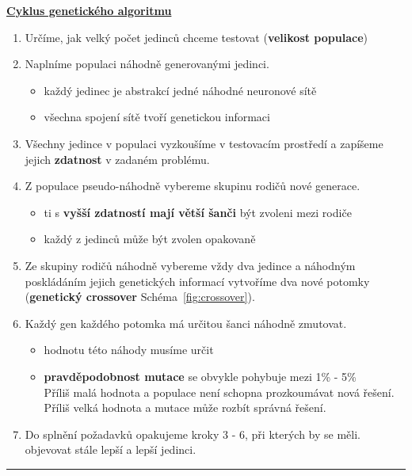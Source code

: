 \documentclass[a4paper,12pt]{article}
\begin{document}
        \underline{\textbf{\large{Cyklus genetického algoritmu}}}
        \begin{enumerate}[itemsep=-1.5mm] \item Určíme, jak velký počet jedinců chceme testovat (\textbf{velikost populace})
            \item Naplníme populaci náhodně generovanými jedinci.
            \begin{itemize}[noitemsep]
                \item každý jedinec je abstrakcí jedné náhodné neuronové sítě
                \item všechna spojení sítě tvoří genetickou informaci
            \end{itemize}
            \item Všechny jedince v populaci vyzkoušíme v testovacím prostředí a zapíšeme jejich \textbf{zdatnost}
                v zadaném problému.
            \item Z populace pseudo-náhodně vybereme skupinu rodičů nové generace.
            \begin{itemize}[noitemsep]
                \item ti s \textbf{vyšší zdatností mají větší šanči} být zvoleni mezi rodiče
                \item každý z jedinců může být zvolen opakovaně
            \end{itemize}
            \item Ze skupiny rodičů náhodně vybereme vždy dva jedince a náhodným poskládáním jejich
                genetických informací vytvoříme dva nové potomky (\textbf{genetický crossover} Schéma~\ref{fig:crossover}).
            \item Každý gen každého potomka má určitou šanci náhodně zmutovat.
            \begin{itemize}[noitemsep]
                \item hodnotu této náhody musíme určit
                \item \textbf{pravděpodobnost mutace} se obvykle pohybuje mezi 1\% - 5\%\\
                    Příliš malá hodnota a populace není schopna prozkoumávat nová řešení.
                    Příliš velká hodnota a mutace může rozbít správná řešení.

            \end{itemize}
            \item Do splnění požadavků opakujeme kroky 3 - 6, při kterých by se měli.
                objevovat stále lepší a lepší jedinci.
        \end{enumerate}
        \hrule
\end{document}
